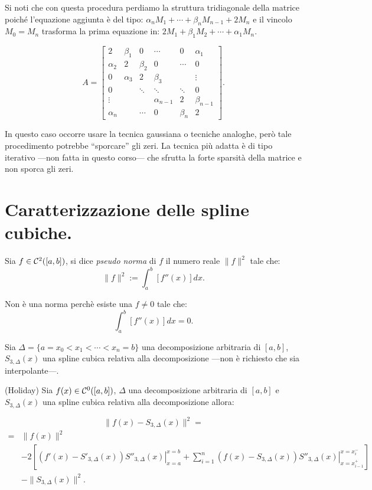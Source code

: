 \begin{osse}
Si noti che con questa procedura perdiamo la struttura tridiagonale della 
matrice poiché l'equazione aggiunta è del tipo: $ \alpha_nM_1 + \cdots
+ \beta_n M_{n-1} + 2 M_n $ e il vincolo $M_0 = M_n$ trasforma la prima
equazione in: $2M_1 + \beta_1M_2 + \cdots + \alpha_1M_n$.

\[A =
\left[
\begin{array}{cccccc}
2 & \beta_1 & 0 & \cdots &0 &\alpha_1 \\
\alpha_2&  2 & \beta_2 & 0  &\cdots & 0 \\
0 &\alpha_3 & 2 & \beta_3 & & \vdots \\
0  & &\ddots &\ddots &\ddots &  0\\
\vdots & & &\alpha_{n-1} & 2& \beta_{n-1}\\
\alpha_n & & \cdots & 0 &\beta_n & 2
\end{array}
\right].
\]
\end{osse}

In questo caso occorre usare la tecnica gaussiana o tecniche analoghe, però
tale procedimento potrebbe ``sporcare'' gli zeri. La tecnica più adatta è di 
tipo iterativo ---non fatta in questo corso--- che sfrutta la forte
sparsità della matrice e non sporca gli zeri.

\section{Caratterizzazione delle spline cubiche.}

\begin{defi}
Sia $f \in \mathcal{C}^2([a,b])$, si dice \emph{pseudo norma} di $f$ il numero reale
$\|f\|^2$ tale che:
\[
\|f\|^2 := \int_a^b\left[f''(x)\right]dx.
\]

Non è una norma perchè esiste una $f \neq 0$ tale che:
\[\int_a^b\left[f''(x)\right]dx = 0.\]
\end{defi}

Sia $\Delta = \{ a = x_0 < x_1 < \cdots < x_n = b\}$ una decomposizione
arbitraria di $[a,b]$, $S_{3,\Delta}(x)$ una spline cubica relativa alla
decomposizione ---non è richiesto che sia interpolante---.

\begin{teo}(Holiday)
Sia $f(x) \in \mathcal{C}^0([a,b])$, $\Delta$ una decomposizione arbitraria di $[a,b]$
e $S_{3,\Delta}(x)$  una spline cubica relativa alla decomposizione allora:

\[
\|f(x) - S_{3,\Delta}(x)\|^2 = 
\]
\[
\begin{array}{cl}
= &\|f(x)\|^2 \\
  &- 2 \left[ \left.\left(f'(x)- S'_{3,\Delta}(x)\right) 
S''_{3,\Delta}(x)\right|_{x = a}^{x= b} + \left.\sum_{i=1}^n(f(x) - S_{3,\Delta}(x))
S''_{3,\Delta}(x)\right|_{x = x_{i-1}^+}^{x=x_i^-}\right] \\
& - \| S_{3,\Delta}(x)\|^2.
\end{array}
\]
\end{teo}

